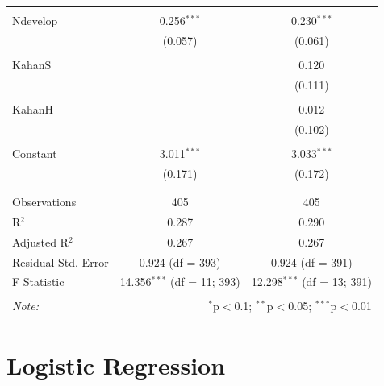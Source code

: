 \documentclass[
]{article}
\begin{document}
\begin{table}[!htbp]
\begin{tabular}{@{\extracolsep{5pt}}lcc}
  & & \\ 
 Ndevelop & 0.256$^{***}$ & 0.230$^{***}$ \\ 
  & (0.057) & (0.061) \\ 
  & & \\ 
 KahanS &  & 0.120 \\ 
  &  & (0.111) \\ 
  & & \\ 
 KahanH &  & 0.012 \\ 
  &  & (0.102) \\ 
  & & \\ 
 Constant & 3.011$^{***}$ & 3.033$^{***}$ \\ 
  & (0.171) & (0.172) \\ 
  & & \\ 
\hline \\[-1.8ex] 
Observations & 405 & 405 \\ 
R$^{2}$ & 0.287 & 0.290 \\ 
Adjusted R$^{2}$ & 0.267 & 0.267 \\ 
Residual Std. Error & 0.924 (df = 393) & 0.924 (df = 391) \\ 
F Statistic & 14.356$^{***}$ (df = 11; 393) & 12.298$^{***}$ (df = 13; 391) \\ 
\hline 
\hline \\[-1.8ex] 
\textit{Note:}  & \multicolumn{2}{r}{$^{*}$p$<$0.1; $^{**}$p$<$0.05; $^{***}$p$<$0.01} \\ 
\end{tabular} 
\end{table} 
\endgroup
\newpage

\hypertarget{logistic-regression}{%
\section{Logistic Regression}\label{logistic-regression}}
\end{document}
